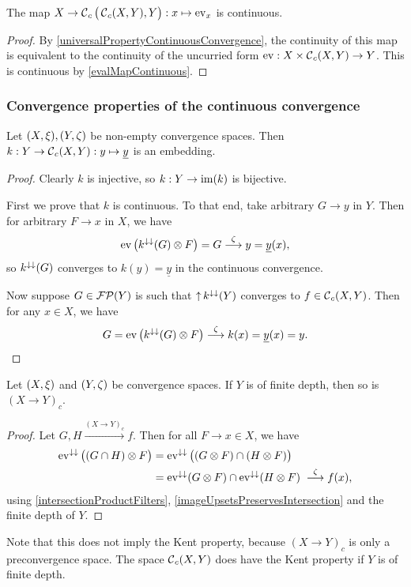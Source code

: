 \begin{proposition} \label{curriedEvalMapContinuous}
The map $X\to \operatorname{\mathcal{C}}_c\big(\operatorname{\mathcal{C}}_c(X,Y),Y\big): x\mapsto \operatorname{ev}_x$ is continuous.
\end{proposition}
\begin{proof}
By \ref{universalPropertyContinuousConvergence}, the continuity of this map is equivalent to the continuity of the uncurried form $\operatorname{ev}: X\times \operatorname{\mathcal{C}}_c(X,Y) \to Y$. This is continuous by \ref{evalMapContinuous}.
\end{proof}


\subsubsection{Convergence properties of the continuous convergence}
\begin{lemma} \label{embeddingInContinuousConvergence}
Let $\sSet{X,\xi}, \sSet{Y,\zeta}$ be non-empty convergence spaces. Then $k: Y \to \operatorname{\mathcal{C}}_c(X,Y): y\mapsto \underline{y}$ is an embedding.
\end{lemma}
\begin{proof}
Clearly $k$ is injective, so $k: Y\to \operatorname{im}(k)$ is bijective.

First we prove that $k$ is continuous. To that end, take arbitrary $G\to y$ in $Y$. Then for arbitrary $F\to x$ in $X$, we have
\[ \operatorname{ev}\big(k^{\downarrow\downarrow}(G)\otimes F\big) = G \overset{\zeta}{\longrightarrow} y = \underline{y}(x), \]
so $k^{\downarrow\downarrow}(G)$ converges to $k(y) = \underline{y}$ in the continuous convergence.

Now suppose $G\in\operatorname{\mathcal{FP}}(Y)$ is such that $\operatorname{\uparrow} k^{\downarrow\downarrow}(Y)$ converges to $f\in \operatorname{\mathcal{C}}_c(X,Y)$. Then for any $x\in X$, we have
\[ G = \operatorname{ev}\big(k^{\downarrow\downarrow}(G)\otimes F\big) \overset{\zeta}{\longrightarrow} k(x) = \underline{y}(x) = y. \]
\end{proof}

\begin{lemma}
Let $\sSet{X,\xi}$ and $\sSet{Y,\zeta}$ be convergence spaces. If $Y$ is of finite depth, then so is $(X\to Y)_c$.
\end{lemma}
\begin{proof}
Let $G, H\overset{(X\to Y)_c}{\longrightarrow} f$. Then for all $F\to x\in X$, we have
\begin{align*}
\operatorname{ev}^{\downarrow\downarrow}\big((G\cap H)\otimes F\big) &= \operatorname{ev}^{\downarrow\downarrow}\big((G \otimes F) \cap (H \otimes F)\big) \\
&= \operatorname{ev}^{\downarrow\downarrow}(G \otimes F) \cap \operatorname{ev}^{\downarrow\downarrow}(H \otimes F) \; \overset{\zeta}{\longrightarrow} f(x),
\end{align*}
using \ref{intersectionProductFilters}, \ref{imageUpsetsPreservesIntersection} and the finite depth of $Y$.
\end{proof}
Note that this does not imply the Kent property, because $(X\to Y)_c$ is only a preconvergence space. The space $\operatorname{\mathcal{C}}_c(X,Y)$ does have the Kent property if $Y$ is of finite depth.

